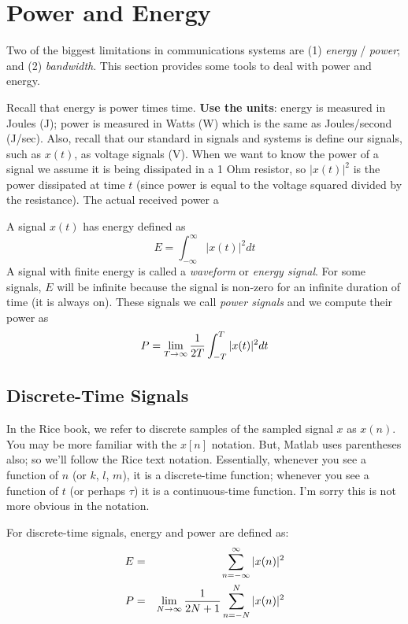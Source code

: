 




\section{Power and Energy}


Two of the biggest limitations in communications systems are (1) \textit{energy} / \textit{power}; and (2) \textit{bandwidth}.  This section provides some tools to deal with power and energy.


Recall that energy is power times time.  \textbf{Use the units}:  energy is measured in Joules (J); power is measured in Watts (W) which is the same as Joules/second (J/sec).  Also, recall that our standard in signals and systems is define our signals, such as $x(t)$, as voltage signals (V).  When we want to know the power of a signal we assume it is being dissipated in a 1 Ohm resistor, so $|x(t)|^2$ is the power dissipated at time $t$ (since power is equal to the voltage squared divided by the resistance).  The actual received power a

A signal $x(t)$ has energy defined as
\[
E = \int_{-\infty}^\infty |x(t)|^2 dt
\]
A signal with finite energy is called a \emph{waveform} or \emph{energy signal}.  
For some signals, $E$ will be infinite because the signal is
non-zero for an infinite duration of time (it is always on).  These
signals we call {\it power signals} and we compute their power as
\[
  P = \lim_{{T}\rightarrow \infty} \frac{1}{2T} \int_{-T}^T |x(t)|^2 dt
\]



\subsection{Discrete-Time Signals}

In the Rice book, we refer to discrete samples of the sampled signal $x$
as $x(n)$.  You may be more familiar with the $x[n]$ notation.  But,
Matlab uses parentheses also; so we'll follow the Rice text
notation.  Essentially, whenever you see a function of $n$ (or $k$, $l$, $m$), it is a discrete-time function; whenever you see a function of $t$ (or perhaps $\tau$) it is a continuous-time function.  I'm sorry this is not more obvious in the notation.

For discrete-time signals, energy and power are defined as:
\begin{eqnarray}
  E &=& \sum_{n=-\infty}^\infty |x(n)|^2 \\
  P &=& \lim_{{N}\rightarrow \infty} \frac{1}{2N+1} \sum_{n=-N}^N |x(n)|^2
\end{eqnarray}


